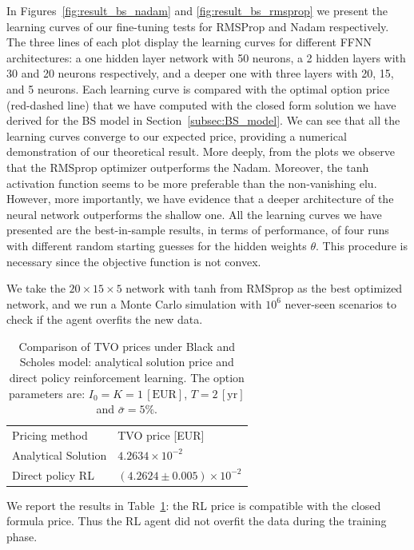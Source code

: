 \documentclass[11pt]{article}
\begin{document}
In Figures~\ref{fig:result_bs_nadam} and \ref{fig:result_bs_rmsprop} we present the learning curves of our fine-tuning tests for RMSProp and Nadam respectively. The three lines of each plot display the learning curves for different FFNN architectures: a one hidden layer network with 50 neurons, a 2 hidden layers with 30 and 20 neurons respectively, and a deeper one with three layers with 20, 15, and 5 neurons. Each learning curve is compared with the optimal option price (red-dashed line) that we have computed with the closed form solution we have derived for the BS model in Section~\ref{subsec:BS_model}. We can see that all the learning curves converge to our expected price, providing a numerical demonstration of our theoretical result. More deeply, from the plots we observe that the RMSprop optimizer outperforms the Nadam. Moreover, the tanh activation function seems to be more preferable than the non-vanishing elu. However, more importantly, we have evidence that a deeper architecture of the neural network outperforms the shallow one. All the learning curves we have presented are the best-in-sample results, in terms of performance, of four runs with different random starting guesses for the hidden weights $\theta$. This procedure is necessary since the objective function is not convex.

We take the $20\times 15 \times 5$ network with tanh from RMSprop as the best optimized network, and we run a Monte Carlo simulation with $10^6$ never-seen scenarios to check if the agent overfits the new data. 
\begin{table}
\begin{center}
\begin{tabular}{ll}
\hline\noalign{\smallskip}
Pricing method & TVO price [EUR] \\
\noalign{\smallskip}
\hline
\noalign{\smallskip}
Analytical Solution & $4.2634\times 10^{-2}$ \\
Direct policy RL & $(4.2624 \pm 0.005) \times 10^{-2}$ \\ 
\hline
\end{tabular}
\end{center}
\caption{Comparison of TVO prices under Black and Scholes model: analytical solution price and direct policy reinforcement learning. The option parameters are: $I_0=K=1\,[\text{EUR}]$, $T=2\,[\text{yr}]$ and $\bar{\sigma}=5\%$.}
\label{tab:mc_results_bs}
\end{table}
\setlength{\tabcolsep}{1.4pt}
We report the results in Table~\ref{tab:mc_results_bs}: the RL price is compatible with the closed formula price. Thus the RL agent did not overfit the data during the training phase.
\end{document}
